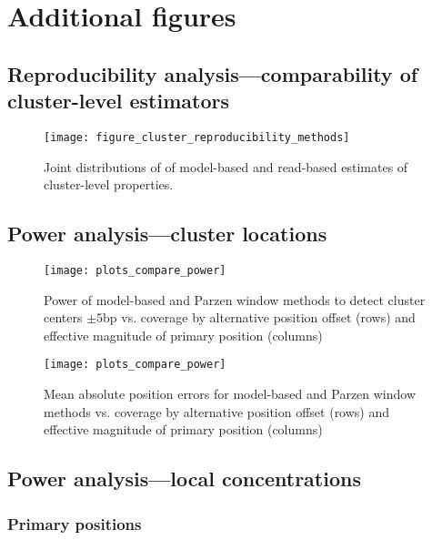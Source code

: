 \documentclass[12pt]{article}
\begin{document}
\section{Additional figures}

\subsection{Reproducibility analysis---comparability of cluster-level estimators}

\ifx\nofigures\undefined
\begin{figure}[h!]
\texttt{[image: figure\_cluster\_reproducibility\_methods]}
\caption{Joint distributions of of model-based and read-based estimates of cluster-level properties. \label{fig:methodComparison}}
\end{figure}
\fi

\subsection{Power analysis---cluster locations}
\label{sec:cluster}

\begin{sidewaysfigure}
\centering
\texttt{[image: plots\_compare\_power]}
\caption{Power of model-based and Parzen window methods to detect cluster centers $\pm 5$bp vs. coverage by alternative position offset (rows) and effective magnitude of primary position (columns)}
\end{sidewaysfigure}

\begin{sidewaysfigure}
\centering
\texttt{[image: plots\_compare\_power]}
\caption{Mean absolute position errors for model-based and Parzen window methods vs. coverage by alternative position offset (rows) and effective magnitude of primary position (columns)}
\end{sidewaysfigure}

\clearpage

\subsection{Power analysis---local concentrations}
\label{sec:detection}

\subsubsection{Primary positions}
\end{document}
